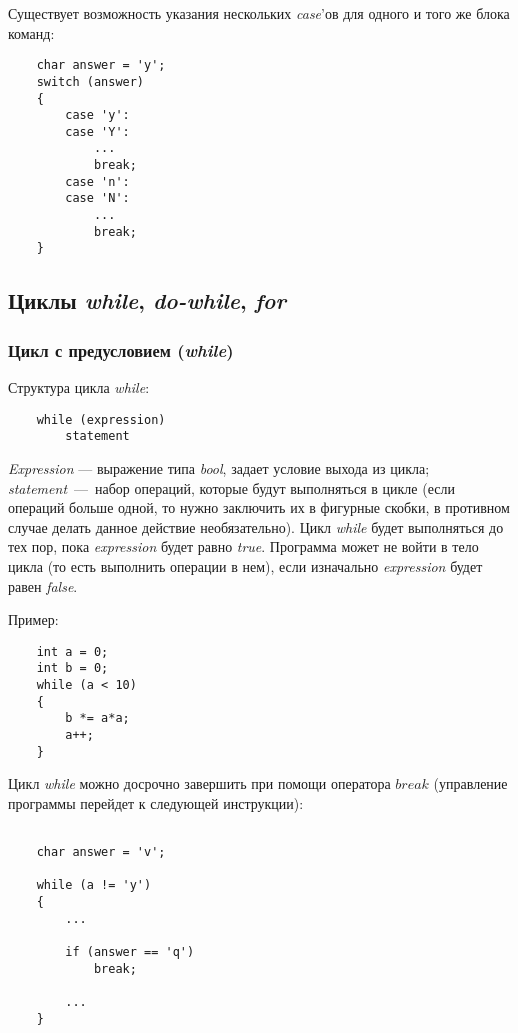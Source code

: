 Существует возможность указания нескольких \textit{case}'ов для одного и того же блока команд:

\begin{lstlisting}
    char answer = 'y';
    switch (answer)
    {
        case 'y':
        case 'Y':
            ...
            break;
        case 'n':
        case 'N':
            ...
            break;
    }
\end{lstlisting}
 
\subsection{Циклы \textit{while}, \textit{do-while}, \textit{for}}
\subsubsection{Цикл с предусловием (\textit{while})}
Структура цикла \textit{while}:
\begin{lstlisting}
    while (expression)
        statement
\end{lstlisting}
 
\textit{Expression} --- выражение типа \textit{bool}, задает условие выхода из цикла; \textit{statement}~---~набор операций, которые будут выполняться в цикле (если операций больше одной, то нужно заключить их в фигурные скобки, в противном случае делать данное действие необязательно). Цикл \textit{while} будет выполняться до тех пор, пока \textit{expression} будет равно \textit{true}. Программа может не войти в тело цикла (то есть выполнить операции в нем), если изначально \textit{expression} будет равен \textit{false}.

Пример:

\begin{lstlisting}
    int a = 0;
    int b = 0;
    while (a < 10)
    {
        b *= a*a;
        a++;
    }
\end{lstlisting}

Цикл \textit{while} можно досрочно завершить при помощи оператора $break$ (управление программы перейдет к следующей инструкции):

\begin{lstlisting}
    
    char answer = 'v';
    
    while (a != 'y')
    {
        ...
        
        if (answer == 'q')
            break;
            
        ...
    }
    
\end{lstlisting}

